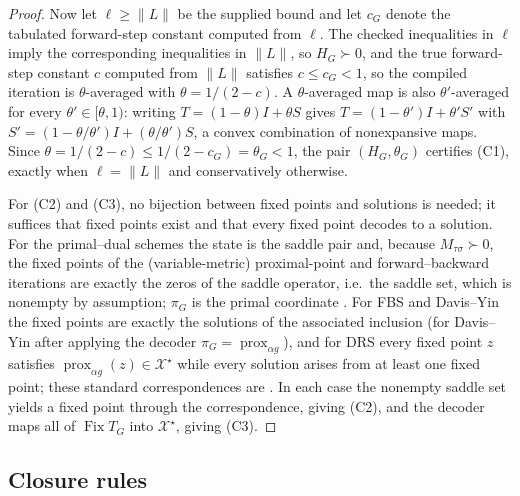 \begin{proof}
Now let $\ell\geq\|L\|$ be the supplied bound and let $c_G$ denote the
tabulated forward-step constant computed from $\ell$. The checked
inequalities in $\ell$ imply the corresponding inequalities in $\|L\|$, so
$H_G\succ0$, and the true forward-step constant $c$ computed from $\|L\|$
satisfies $c\leq c_G<1$, so the compiled iteration is $\theta$-averaged with
$\theta=1/(2-c)$. A $\theta$-averaged map is also $\theta'$-averaged for
every $\theta'\in[\theta,1)$: writing $T=(1-\theta)I+\theta S$ gives
$T=(1-\theta')I+\theta'S'$ with $S'=(1-\theta/\theta')I+(\theta/\theta')S$,
a convex combination of nonexpansive maps. Since
$\theta=1/(2-c)\leq1/(2-c_G)=\theta_G<1$, the pair $(H_G,\theta_G)$
certifies (C1), exactly when $\ell=\|L\|$ and conservatively otherwise.

For (C2) and (C3), no bijection between fixed points and solutions is
needed; it suffices that fixed points exist and that every fixed point
decodes to a solution. For the primal--dual schemes the state is the saddle
pair and, because $M_{\tau\sigma}\succ0$, the fixed points of the
(variable-metric) proximal-point and forward--backward iterations are
exactly the zeros of the saddle operator, i.e.\ the saddle set, which is
nonempty by assumption; $\pi_G$ is the primal coordinate
\citep[\S3.3]{RyuYin2022LargeScale}. For FBS and Davis--Yin the fixed points
are exactly the solutions of the associated inclusion (for Davis--Yin after
applying the decoder $\pi_G=\operatorname{prox}_{\alpha g}$), and for DRS
every fixed point $z$ satisfies
$\operatorname{prox}_{\alpha g}(z)\in\mathcal X^\star$ while every solution
arises from at least one fixed point; these standard correspondences are
\citep[\S2.7]{RyuYin2022LargeScale}. In each case the nonempty saddle set
yields a fixed point through the correspondence, giving (C2), and the
decoder maps all of $\operatorname{Fix}T_G$ into $\mathcal X^\star$, giving
(C3).
\end{proof}


\subsection{Closure rules}

